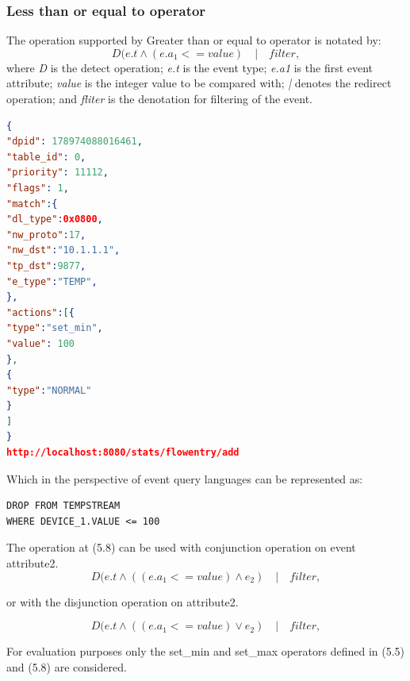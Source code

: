\subsubsection{Less than or equal to operator}
The operation supported by Greater than or equal to operator is notated by:
\begin{equation}D(e.t  \wedge (e.a_1 <= value) \quad | \quad filter, \end{equation}
where \textit{D} is the detect operation; \newline
\textit{e.t} is the event type; \newline
\textit{e.a1} is the first event attribute; \newline
\textit{value} is the integer value to be compared with; \newline
\textit{|} denotes the redirect operation; \newline
and \textit{fliter} is the denotation for filtering of the event. \newline \newline
\begin{lstlisting}[language=json,firstnumber=1]
{
"dpid": 178974088016461,
"table_id": 0,
"priority": 11112,
"flags": 1,
"match":{
"dl_type":0x0800,
"nw_proto":17,
"nw_dst":"10.1.1.1",
"tp_dst":9877,
"e_type":"TEMP",
},
"actions":[{
"type":"set_min",
"value": 100
},
{
"type":"NORMAL"
}
]
}
http://localhost:8080/stats/flowentry/add \end{lstlisting}

Which in the perspective of event query languages can be represented as:

\begin{verbatim}
DROP FROM TEMPSTREAM
WHERE DEVICE_1.VALUE <= 100
\end{verbatim}

The operation at (5.8) can be used with conjunction operation on event attribute2.
\begin{equation}D(e.t  \wedge ((e.a_1 <= value) \wedge e_2 )\quad | \quad filter, \end{equation}

or with the disjunction operation on attribute2.

\begin{equation}D(e.t  \wedge ((e.a_1 <= value) \vee e_2 )\quad | \quad filter, \end{equation}

For evaluation purposes only the set_min and set_max operators defined in (5.5) and (5.8) are considered. 



